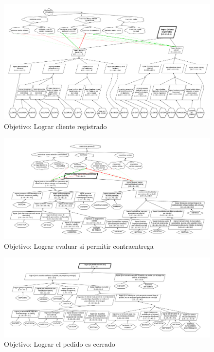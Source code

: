 \newpage
\begin{figure}[H]
  \begin{center}
  \includegraphics[angle=90,height=\textheight]{images/objetivos-cliente-registrado.pdf}
  \caption{Objetivo: Lograr cliente registrado}
  \end{center}
\end{figure}

\newpage
\begin{figure}[H]
  \begin{center}
  \includegraphics[angle=90,height=\textheight]{images/objetivos-permitir-contraentrega.pdf}
  \caption{Objetivo: Lograr evaluar si permitir contraentrega}
  \end{center}
\end{figure}

\newpage
\begin{figure}[H]
  \begin{center}
  \includegraphics[angle=90,height=\textheight]{images/objetivos-cerrar-pedido.pdf}
  \caption{Objetivo: Lograr el pedido es cerrado}
  \end{center}
\end{figure}

